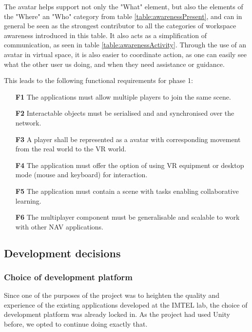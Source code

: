 The avatar helps support not only the "What" element, but also the elements of the "Where" an "Who" category from table \ref{table:awarenessPresent}, and can in general be seen as the strongest contributor to all the categories of workspace awareness introduced in this table. It also acts as a simplification of communication, as seen in table \ref{table:awarenessActivity}. Through the use of an avatar in virtual space, it is also easier to coordinate action, as one can easily see what the other user us doing, and when they need assistance or guidance.


This leads to the following functional requirements for phase 1: 


\begin{enumerate}
  \setlength\itemsep{0em}
  \item [\textbf{F1}] The applications must allow multiple players to join the same scene.
  \item [\textbf{F2}] Interactable objects must be serialised and and synchronised over the network.
  \item [\textbf{F3}] A player shall be represented as a avatar with corresponding movement from the real world to the VR world.
  \item [\textbf{F4}] The application must offer the option of using VR equipment or desktop mode (mouse and keyboard) for interaction.
  \item [\textbf{F5}] The application must contain a scene with tasks enabling collaborative learning.
  \item [\textbf{F6}] The multiplayer component must be generalisable and scalable to work with other NAV applications.
\end{enumerate}

\subsection{Development decisions}
\subsubsection{Choice of development platform}
Since one of the purposes of the project was to heighten the quality and experience of the existing applications developed at the IMTEL lab, the choice of development platform was already locked in. As the project had used Unity before, we opted to continue doing exactly that.





